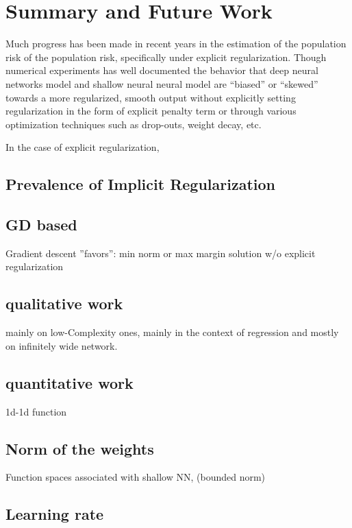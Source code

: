 \chapter{Summary and Future Work}

Much progress has been made in recent years in the estimation of the population
risk of the population risk, specifically under explicit regularization. Though
numerical experiments has well documented \TOCITE the behavior that deep neural
networks model and shallow neural neural model are ``biased'' or ``skewed''
towards a more regularized, smooth output without explicitly setting
regularization in the form of explicit penalty term or through various
optimization techniques such as drop-outs, weight decay, etc.

In the case of explicit regularization, 

\section{Prevalence of Implicit Regularization}

\section{GD based}

Gradient descent ”favors”: min norm or max margin solution w/o explicit
regularization

\section{qualitative work}

mainly on low-Complexity ones, mainly in the context of regression
and mostly on infinitely wide network.

\section{quantitative work}

1d-1d function 

\section{Norm of the weights}

Function spaces associated with shallow NN, (bounded norm)

\section{Learning rate}


